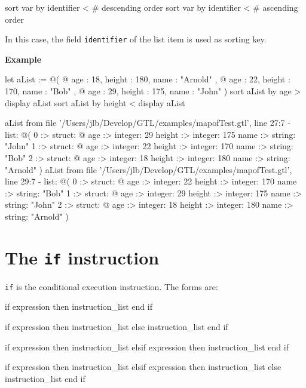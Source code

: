 \documentclass[10pt,openright,twosides]{report}
\newcommand{\gtlinline}[1]{\colorbox{light-blue}{\lstinline[language=gtl]{#1}}}
\newcommand{\example}{\vspace{.75em}\noindent\textbf{Example}\vspace{0em}}
\begin{document}
\begin{gtl}
sort var by identifier < # descending order
sort var by identifier < # ascending order
\end{gtl}

In this case, the field \gtlinline{identifier} of the list item is used as sorting key.

\example
\begin{gtl}
let aList := @(
  @{ age : 18, height : 180, name : "Arnold" },
  @{ age : 22, height : 170, name : "Bob"    },
  @{ age : 29, height : 175, name : "John"   }
)
sort aList by age >
display aList
sort aList by height <
display aList
\end{gtl}
\begin{console}
aList from file '/Users/jlb/Develop/GTL/examples/mapofTest.gtl', line 27:7
  - list: @(
    0 :>
        struct: @{
            age :>
                integer: 29
            height :>
                integer: 175
            name :>
                string: "John"
        }
    1 :>
        struct: @{
            age :>
                integer: 22
            height :>
                integer: 170
            name :>
                string: "Bob"
        }
    2 :>
        struct: @{
            age :>
                integer: 18
            height :>
                integer: 180
            name :>
                string: "Arnold"
        }
)
aList from file '/Users/jlb/Develop/GTL/examples/mapofTest.gtl', line 29:7
  - list: @(
    0 :>
        struct: @{
            age :>
                integer: 22
            height :>
                integer: 170
            name :>
                string: "Bob"
        }
    1 :>
        struct: @{
            age :>
                integer: 29
            height :>
                integer: 175
            name :>
                string: "John"
        }
    2 :>
        struct: @{
            age :>
                integer: 18
            height :>
                integer: 180
            name :>
                string: "Arnold"
        }
)
\end{console}

\section{The \texttt{if} instruction}

\gtlinline{if} is the conditional execution instruction. The forms are:

\begin{gtl}
if expression then
  instruction_list
end if

if expression then
  instruction_list
else
  instruction_list
end if

if expression then
  instruction_list
elsif expression then
  instruction_list
end if

if expression then
  instruction_list
elsif expression then
  instruction_list
else
  instruction_list
end if
\end{gtl}    
\end{document}
